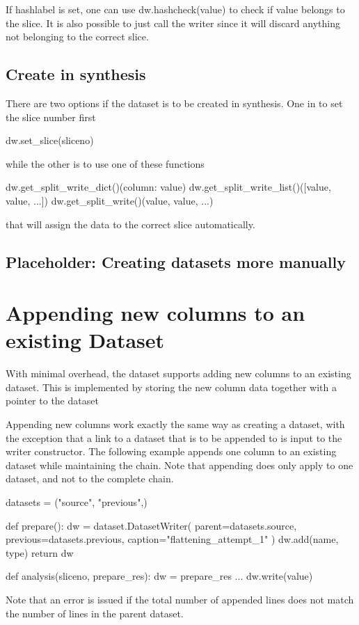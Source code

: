 If hashlabel is set, one can use dw.hashcheck(value) to check if value
belongs to the slice.  It is also possible to just call the writer
since it will discard anything not belonging to the correct slice.



\subsection{Create in synthesis}

There are two options if the dataset is to be created in synthesis.
One in to set the slice number first

\begin{python}
  dw.set_slice(sliceno)
\end{python}
while the other is to use one of these functions

\begin{python}
  dw.get_split_write_dict()({column: value})
  dw.get_split_write_list()([value, value, ...])
  dw.get_split_write()(value, value, ...)
\end{python}
that will assign the data to the correct slice automatically.

\subsection{Placeholder:  Creating datasets more manually}


\newpage
\section{Appending new columns to an existing Dataset}

With minimal overhead, the dataset supports adding new columns to an
existing dataset.  This is implemented by storing the new column data
together with a pointer to the dataset

Appending new columns work exactly the same way as creating a dataset,
with the exception that a link to a dataset that is to be appended to
is input to the writer constructor.  The following example appends one
column to an existing dataset while maintaining the chain.  Note that
appending does only apply to one dataset, and not to the complete
chain.

\begin{python}
datasets = ("source", "previous",)

def prepare():
  dw = dataset.DatasetWriter(
    parent=datasets.source,
    previous=datasets.previous,
    caption="flattening_attempt_1"
  )
  dw.add(name, type)
  return dw

def analysis(sliceno, prepare_res):
  dw = prepare_res
  ...
  dw.write(value)
\end{python}
Note that an error is issued if the total number of appended lines
does not match the number of lines in the parent dataset.
